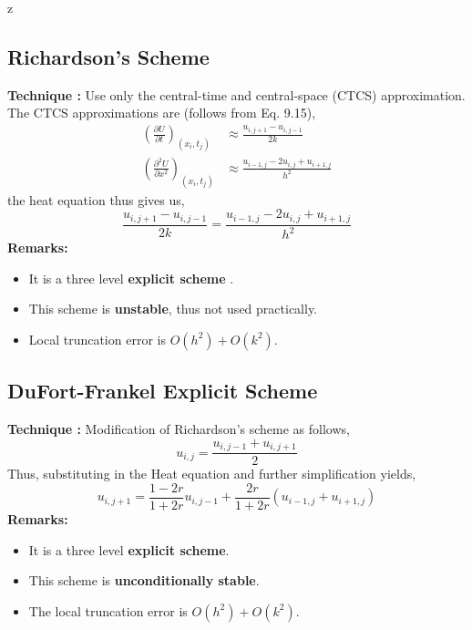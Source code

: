 z\documentclass[a4paper,12pt,twoside]{book}
\newcommand{\nll}[0]{\newline\newline}
\newcommand{\pder}[2]{\frac{\partial #1}{\partial #2}}
\begin{document}
\subsection{Richardson's Scheme}
\textbf{Technique : }Use only the central-time and central-space (CTCS) approximation.
\nll
The CTCS approximations are (follows from Eq. 9.15),
\begin{equation}
    \begin{split}
        \left(\pder{U}{t}\right)_{(x_i,t_j)} &\approx \frac{u_{i,j+1} - u_{i,j-1}}{2k}\\
        \left( \pder{^2U}{x^2}\right)_{(x_i,t_j)} &\approx \frac{u_{i-1,j} -2u_{i,j} + u_{i+1,j}}{h^2}
    \end{split}
\end{equation}
the heat equation thus gives us,
\begin{equation}
    \frac{u_{i,j+1} - u_{i,j-1}}{2k} =  \frac{u_{i-1,j} -2u_{i,j} + u_{i+1,j}}{h^2}
\end{equation}
\textbf{Remarks:}
\begin{itemize}
    \item {It is a three level \textbf{explicit scheme} .}
    \item{This scheme is \textbf{unstable}, thus not used practically.}
    \item{Local truncation error is $O(h^2) + O(k^2)$.}
\end{itemize}
\subsection{DuFort-Frankel Explicit Scheme}
\textbf{Technique : }Modification of Richardson's scheme as follows,
\begin{equation}
    u_{i,j} = \frac{u_{i,j-1}  +  u_{i,j+1}}{2}
\end{equation}
Thus, substituting in the Heat equation and further simplification yields,
\begin{equation}
    u_{i,j+1} = \frac{1-2r}{1+2r} u_{i,j-1} + \frac{2r}{1+2r} (u_{i-1,j} + u_{i+1,j})
\end{equation}
\textbf{Remarks:}
\begin{itemize}
    \item {It is a three level \textbf{explicit scheme}.}
    \item{This scheme is \textbf{unconditionally stable}.}
    \item{The local truncation error is $O(h^2) + O(k^2)$.}
\end{itemize}
\end{document}
